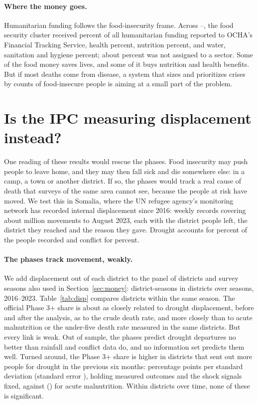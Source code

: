 \documentclass[11pt]{article}
\begin{document}
\paragraph{Where the money goes.} Humanitarian funding follows the food-insecurity frame. Across \ftsYearZero{}--\ftsYearOne{}, the food security cluster received \ftsFood{} percent of all humanitarian funding reported to OCHA's Financial Tracking Service, health \ftsHealth{} percent, nutrition \ftsNutrition{} percent, and water, sanitation and hygiene \ftsWash{} percent; about \ftsUntagged{} percent was not assigned to a sector. Some of the food money saves lives, and some of it buys nutrition and health benefits. But if most deaths come from disease, a system that sizes and prioritizes crises by counts of food-insecure people is aiming at a small part of the problem.

\section{Is the IPC measuring displacement instead?}\label{sec:displacement}

One reading of these results would rescue the phases. Food insecurity may push people to leave home, and they may then fall sick and die somewhere else: in a camp, a town or another district. If so, the phases would track a real cause of death that surveys of the same area cannot see, because the people at risk have moved. We test this in Somalia, where the UN refugee agency's monitoring network has recorded internal displacement since 2016: \dpRecords{} weekly records covering about \dpPeople{} million movements to August 2023, each with the district people left, the district they reached and the reason they gave. Drought accounts for \dpDroughtShare{} percent of the people recorded and conflict for \dpConflictShare{} percent.

\paragraph{The phases track movement, weakly.} We add displacement out of each district to the panel of districts and survey seasons also used in Section~\ref{sec:money}: \dpAN{} district-seasons in \dpADistricts{} districts over \dpASeasons{} seasons, 2016--2023. Table~\ref{tab:disp} compares districts within the same season. The official Phase 3+ share is about as closely related to drought displacement, before and after the analysis, as to the crude death rate, and more closely than to acute malnutrition or the under-five death rate measured in the same districts. But every link is weak. Out of sample, the phases predict drought departures no better than rainfall and conflict data do, and no information set predicts them well. Turned around, the Phase 3+ share is higher in districts that sent out more people for drought in the previous six months: \dpPBDr{} percentage points per standard deviation (standard error \dpPBDrSe{}), holding measured outcomes and the shock signals fixed, against \dpPBGam{} (\dpPBGamSe{}) for acute malnutrition. Within districts over time, none of these is significant.
\end{document}
